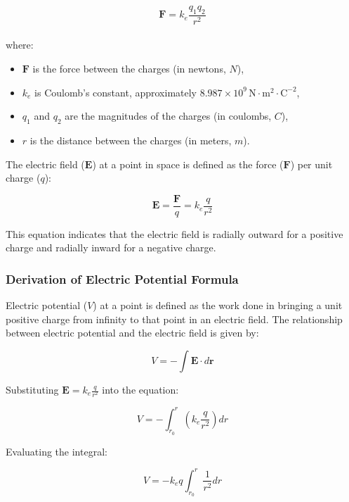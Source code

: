 \documentclass[12pt,a4paper]{report}
\begin{document}
\begin{equation}
\mathbf{F} = k_e \frac{q_1 q_2}{r^2}
\end{equation}
\\
where:
\begin{itemize}
    \item \(\mathbf{F}\) is the force between the charges (in newtons, \(N\)),
    \item \(k_e\) is Coulomb's constant, approximately \(8.987 \times 10^9 \, \mathrm{N \cdot m^2 \cdot C^{-2}}\),
    \item \(q_1\) and \(q_2\) are the magnitudes of the charges (in coulombs, \(C\)),
    \item \(r\) is the distance between the charges (in meters, \(m\)).
\end{itemize}

The electric field (\(\mathbf{E}\)) at a point in space is defined as the force (\(\mathbf{F}\)) per unit charge (\(q\)):

\begin{equation}
\mathbf{E} = \frac{\mathbf{F}}{q} = k_e \frac{q}{r^2}
\end{equation}

This equation indicates that the electric field is radially outward for a positive charge and radially inward for a negative charge.

\subsubsection{Derivation of Electric Potential Formula}
Electric potential (\(V\)) at a point is defined as the work done in bringing a unit positive charge from infinity to that point in an electric field. The relationship between electric potential and the electric field is given by:

\begin{equation}
V = - \int \mathbf{E} \cdot d\mathbf{r}
\end{equation}

Substituting \(\mathbf{E} = k_e \frac{q}{r^2}\) into the equation:

\begin{equation}
V = - \int_{r_0}^{r} \left( k_e \frac{q}{r^2} \right) dr
\end{equation}

Evaluating the integral:

\begin{equation}
V = - k_e q \int_{r_0}^{r} \frac{1}{r^2} dr
\end{equation}
\end{document}
